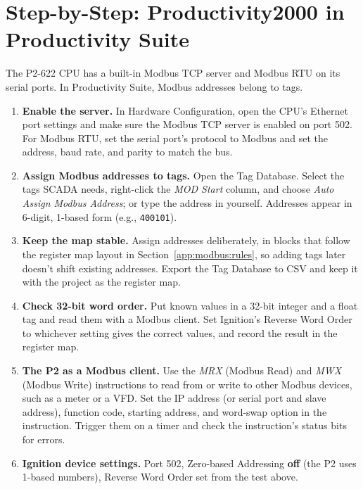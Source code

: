 \section{Step-by-Step: Productivity2000 in Productivity Suite}
\label{app:modbus:p2000}
The P2-622 CPU has a built-in Modbus TCP server and Modbus RTU on its serial ports. In Productivity Suite, Modbus addresses belong to tags.
\begin{enumerate}[itemsep=2pt]
  \item \textbf{Enable the server.} In Hardware Configuration, open the CPU's Ethernet port settings and make sure the Modbus TCP server is enabled on port 502. For Modbus RTU, set the serial port's protocol to Modbus and set the address, baud rate, and parity to match the bus.
  \item \textbf{Assign Modbus addresses to tags.} Open the Tag Database. Select the tags SCADA needs, right-click the \emph{MOD Start} column, and choose \emph{Auto Assign Modbus Address}; or type the address in yourself. Addresses appear in 6-digit, 1-based form (e.g., \texttt{400101}).
  \item \textbf{Keep the map stable.} Assign addresses deliberately, in blocks that follow the register map layout in Section~\ref{app:modbus:rules}, so adding tags later doesn't shift existing addresses. Export the Tag Database to CSV and keep it with the project as the register map.
  \item \textbf{Check 32-bit word order.} Put known values in a 32-bit integer and a float tag and read them with a Modbus client. Set Ignition's Reverse Word Order to whichever setting gives the correct values, and record the result in the register map.
  \item \textbf{The P2 as a Modbus client.} Use the \emph{MRX} (Modbus Read) and \emph{MWX} (Modbus Write) instructions to read from or write to other Modbus devices, such as a meter or a VFD. Set the IP address (or serial port and slave address), function code, starting address, and word-swap option in the instruction. Trigger them on a timer and check the instruction's status bits for errors.
  \item \textbf{Ignition device settings.} Port 502, Zero-based Addressing \textbf{off} (the P2 uses 1-based numbers), Reverse Word Order set from the test above.
\end{enumerate}

